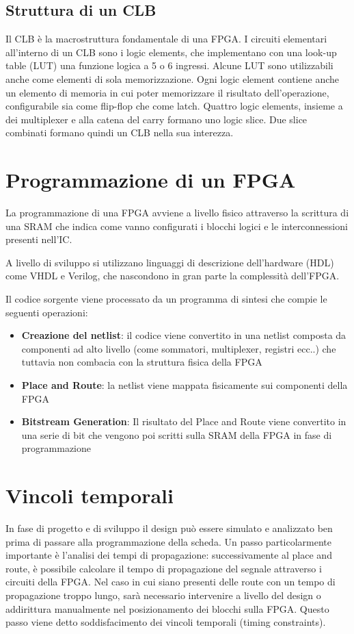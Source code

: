 \subsection{Struttura di un CLB}
Il CLB è la macrostruttura fondamentale di una FPGA.
I circuiti elementari all'interno di un CLB sono i logic elements, che implementano
con una look-up table (LUT) una funzione logica a 5 o 6 ingressi.
Alcune LUT sono utilizzabili anche come elementi di sola memorizzazione.
Ogni logic element contiene anche un elemento di memoria in cui poter memorizzare il risultato
dell'operazione, configurabile sia come flip-flop che come latch.
 Quattro logic elements, insieme a dei multiplexer e alla catena
del carry formano uno logic slice.
Due slice combinati formano quindi un CLB nella sua interezza.

\section{Programmazione di un FPGA}
La programmazione di una FPGA avviene a livello fisico attraverso
la scrittura di una SRAM che indica come vanno configurati i blocchi
logici e le interconnessioni presenti nell'IC.

A livello di sviluppo si utilizzano linguaggi di descrizione dell'hardware
(HDL) come VHDL e Verilog, che nascondono in gran parte la complessità
dell'FPGA.

Il codice sorgente viene processato da un programma di sintesi che compie le seguenti operazioni:

\begin{itemize}
    \item \textbf{Creazione del netlist}: il codice viene convertito in una
          netlist composta da componenti ad alto livello (come sommatori,
          multiplexer, registri ecc..) che tuttavia non combacia
          con la struttura fisica della FPGA
    \item \textbf{Place and Route}: la netlist viene mappata fisicamente sui
          componenti della FPGA
    \item \textbf{Bitstream Generation}: Il risultato del Place and Route viene
          convertito in una serie di bit che vengono poi scritti sulla SRAM
          della FPGA in fase di programmazione
\end{itemize}

\section{Vincoli temporali}
In fase di progetto e di sviluppo il design può essere simulato e analizzato
ben prima di passare alla programmazione della scheda.
Un passo particolarmente importante è l'analisi dei tempi di propagazione:
successivamente al place and route, è possibile calcolare il tempo di propagazione
del segnale attraverso i circuiti della FPGA. Nel caso in cui siano presenti
delle route con un tempo di propagazione troppo lungo, sarà necessario
intervenire a livello del design o addirittura manualmente nel posizionamento
dei blocchi sulla FPGA.
Questo passo viene detto soddisfacimento dei vincoli temporali (timing constraints).

